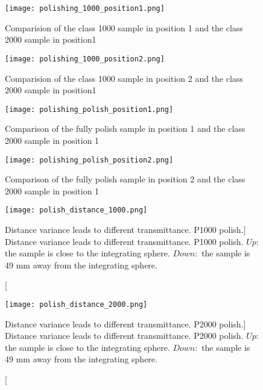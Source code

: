 \begin{figure}
    \centering
    \texttt{[image: polishing\_1000\_position1.png]}
    \caption{Comparision of the class 1000 sample in position 1 and the class 2000 sample in position1}
    \label{fig:polishing_1000_position1}
    \end{figure}


\begin{figure}
    \centering
    \texttt{[image: polishing\_1000\_position2.png]}
    \caption{Comparision of the class 1000 sample in position 2 and the class 2000 sample in position1}
    \label{fig:polishing_1000_position2}
    \end{figure}

\begin{figure}
    \centering
    \texttt{[image: polishing\_polish\_position1.png]}
    \caption{Comparison of the fully polish sample in position 1 and the class 2000 sample in position 1}
    \label{fig:polishing_polish_position1}
    \end{figure}

\begin{figure}
    \centering
    \texttt{[image: polishing\_polish\_position2.png]}
    \caption{Comparison of the fully polish sample in position 2 and the class 2000 sample in position 1}
    \label{fig:polishing_polish_position2}
    \end{figure}


\begin{figure}
    \label{fig:polish_distance_1000}
    \centering
    \texttt{[image: polish\_distance\_1000.png]}
    \caption
    [Distance variance leads to different transmittance. P1000 polish.]
    {Distance variance leads to different transmittance. P1000 polish.
$Up:$ the sample is close to the integrating sphere.
$Down:$ the sample is 49 mm away from the integrating sphere.
}
    \end{figure}


\begin{figure}
    \label{fig:fig:polish_distance_2000}
    \centering
    \texttt{[image: polish\_distance\_2000.png]}
    \caption
    [Distance variance leads to different transmittance. P2000 polish.]
    {Distance variance leads to different transmittance. P2000 polish.
$Up:$ the sample is close to the integrating sphere.
$Down:$ the sample is 49 mm away from the integrating sphere.
}
    \end{figure}


